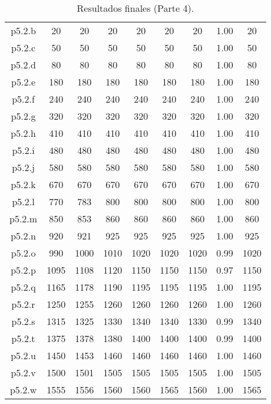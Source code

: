 \begin{table}
\begin{center}
\begin{tabular}{ |c|c|c|c|c|c|c|c|c| }
p5.2.b & 20 & 20 & 20 & 20 & 20 & 20 & 1.00 & 20 \\
p5.2.c & 50 & 50 & 50 & 50 & 50 & 50 & 1.00 & 50 \\
p5.2.d & 80 & 80 & 80 & 80 & 80 & 80 & 1.00 & 80 \\
p5.2.e & 180 & 180 & 180 & 180 & 180 & 180 & 1.00 & 180 \\
p5.2.f & 240 & 240 & 240 & 240 & 240 & 240 & 1.00 & 240 \\
p5.2.g & 320 & 320 & 320 & 320 & 320 & 320 & 1.00 & 320 \\
p5.2.h & 410 & 410 & 410 & 410 & 410 & 410 & 1.00 & 410 \\
p5.2.i & 480 & 480 & 480 & 480 & 480 & 480 & 1.00 & 480 \\
p5.2.j & 580 & 580 & 580 & 580 & 580 & 580 & 1.00 & 580 \\
p5.2.k & 670 & 670 & 670 & 670 & 670 & 670 & 1.00 & 670 \\
p5.2.l & 770 & 783 & 800 & 800 & 800 & 800 & 1.00 & 800 \\
p5.2.m & 850 & 853 & 860 & 860 & 860 & 860 & 1.00 & 860 \\
p5.2.n & 920 & 921 & 925 & 925 & 925 & 925 & 1.00 & 925 \\
p5.2.o & 990 & 1000 & 1010 & 1020 & 1020 & 1020 & 0.99 & 1020 \\
p5.2.p & 1095 & 1108 & 1120 & 1150 & 1150 & 1150 & 0.97 & 1150 \\
p5.2.q & 1165 & 1178 & 1190 & 1195 & 1195 & 1195 & 1.00 & 1195 \\
p5.2.r & 1250 & 1255 & 1260 & 1260 & 1260 & 1260 & 1.00 & 1260 \\
p5.2.s & 1315 & 1325 & 1330 & 1340 & 1340 & 1330 & 0.99 & 1340 \\
p5.2.t & 1375 & 1378 & 1380 & 1400 & 1400 & 1400 & 0.99 & 1400 \\
p5.2.u & 1450 & 1453 & 1460 & 1460 & 1460 & 1460 & 1.00 & 1460 \\
p5.2.v & 1500 & 1501 & 1505 & 1505 & 1505 & 1505 & 1.00 & 1505 \\
p5.2.w & 1555 & 1556 & 1560 & 1560 & 1565 & 1560 & 1.00 & 1565 \\
\hline
\end{tabular}
\end{center}
\caption{Resultados finales (Parte 4).}
\label{tab:resultadosFinales4}
\end{table}



